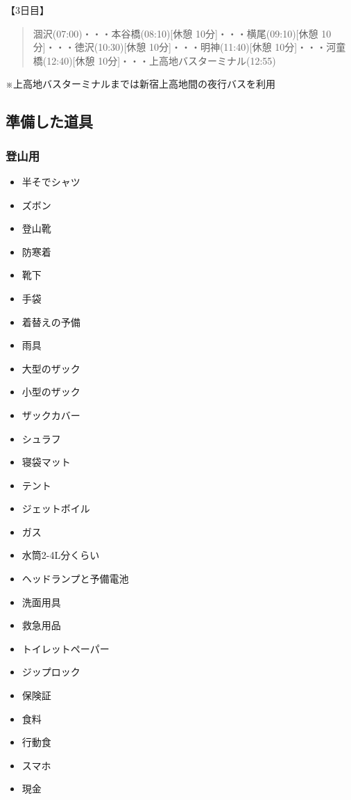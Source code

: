 \documentclass[../main]{subfiles}
\begin{document}
【3日目】
\begin{quote}
  涸沢(07:00)・・・本谷橋(08:10)[休憩 10分]・・・横尾(09:10)[休憩 10分]・・・徳沢(10:30)[休憩 10分]・・・明神(11:40)[休憩 10分]・・・河童橋(12:40)[休憩 10分]・・・上高地バスターミナル(12:55)
\end{quote}


※上高地バスターミナルまでは新宿上高地間の夜行バスを利用

\subsection{準備した道具}

\subsubsection{登山用}
\begin{multicols}{3} %
  \begin{itemize}
    \item 半そでシャツ
    \item ズボン
    \item 登山靴
    \item 防寒着
    \item 靴下
    \item 手袋
    \item 着替えの予備
    \item 雨具
    \item 大型のザック
    \item 小型のザック
    \item ザックカバー
    \item シュラフ
    \item 寝袋マット
    \item テント
    \item ジェットボイル
    \item ガス
    \item 水筒2-4L分くらい
    \item ヘッドランプと予備電池
    \item 洗面用具
    \item 救急用品
    \item トイレットペーパー
    \item ジップロック
    \item 保険証
    \item 食料
    \item 行動食
    \item スマホ
    \item 現金
  \end{itemize}
\end{multicols}
\end{document}
